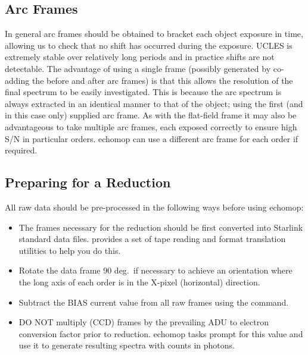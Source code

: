\subsection{Arc Frames}

In general arc frames should be obtained to bracket each object exposure
in time, allowing us to check that no shift has occurred during the
exposure. UCLES is extremely stable over relatively long periods and in
practice shifts are not detectable. The advantage of using a
single frame (possibly generated by co-adding the before and after arc
frames) is that this allows the resolution of the final spectrum to be
easily investigated. This is because the arc spectrum is always
extracted in an identical manner to that of the object; using the first
(and in this case only) supplied arc frame. As with the flat-field frame
it may also be advantageous to take multiple arc frames, each exposed
correctly to ensure high S/N in particular orders.  {\sc echomop} can
use a different arc frame for each order if required.

\subsection{Preparing for a Reduction}

All raw data should be pre-processed in the following ways before
using {\sc echomop}:

\begin{itemize}

\item {}
      The frames necessary for the reduction should be first converted into
      Starlink standard data files.   provides a set of
      tape reading and format translation utilities to help you do this.

\item {}
      Rotate the data frame 90 deg.\ if necessary to achieve an orientation
      where the long axis of each order is in the X-pixel (horizontal)
      direction.

\item {}
      Subtract the BIAS current value from all raw frames using the
        command.

\item {}
      DO NOT multiply (CCD) frames by the prevailing ADU to electron
      conversion factor prior to reduction.  {\sc echomop} tasks prompt for
      this value and use it to generate resulting spectra with counts in
      photons.

\end{itemize}

